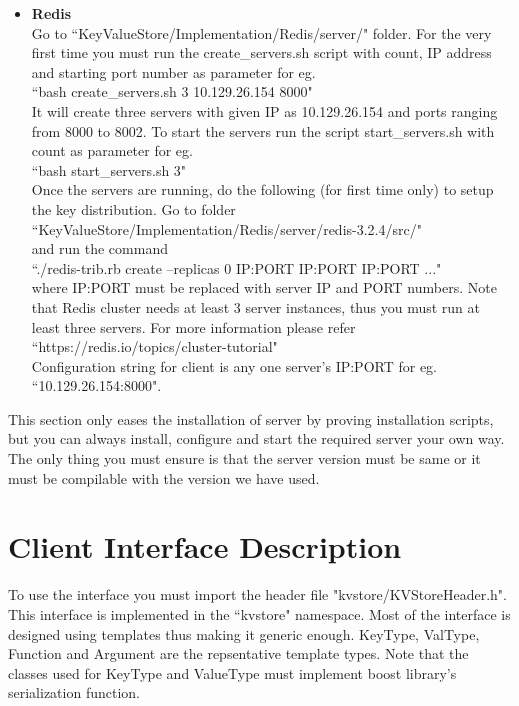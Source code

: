 \documentclass[11pt]{article}
\begin{document}
\begin{itemize}
\item \textbf{Redis}\\
Go to ``KeyValueStore/Implementation/Redis/server/" folder.
For the very first time you must run the create\_servers.sh script with count, IP address and starting port number as parameter for eg.\\
``bash create\_servers.sh 3 10.129.26.154 8000"\\
It will create three servers with given IP as 10.129.26.154 and ports ranging from 8000 to 8002. To start the servers run the script start\_servers.sh with count as parameter for eg.\\
``bash start\_servers.sh 3"\\
Once the servers are running, do the following (for first time only) to setup the key distribution. Go to folder\\
``KeyValueStore/Implementation/Redis/server/redis-3.2.4/src/"\\
and run the command\\
``./redis-trib.rb create --replicas 0 IP:PORT IP:PORT IP:PORT ..."\\
where IP:PORT must be replaced with server IP and PORT numbers.
Note that Redis cluster needs at least 3 server instances, thus you must run at least three servers.
For more information please refer \\
``https://redis.io/topics/cluster-tutorial"\\
Configuration string for client is any one server's IP:PORT for eg.\\ ``10.129.26.154:8000".
\end{itemize}

This section only eases the installation of server by proving installation scripts, but you can always install, configure and start the required server your own way. The only thing you must ensure is that the server version must be same or it must be compilable with the version we have used.



\section{Client Interface Description}
To use the interface you must import the header file "kvstore/KVStoreHeader.h". This interface is implemented in the ``kvstore" namespace. Most of the interface is designed using templates thus making it generic enough. KeyType, ValType, Function and Argument are the repsentative template types. Note that the classes used for KeyType and ValueType must implement boost library's serialization function.
\end{document}
